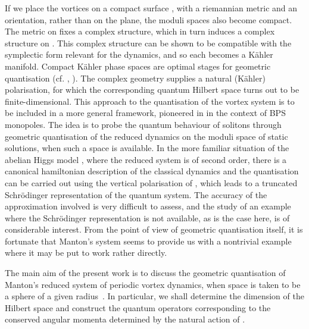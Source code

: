 \documentclass[a4paper,11pt]{article}
\begin{document}
If we place the vortices on a compact surface \myHighlight{$\Sigma$}\coordHE{}, with a
riemannian metric and an orientation, rather than on the
plane, the moduli spaces \coordHE{} also become compact. 
The metric on \myHighlight{$\Sigma$}\coordHE{} fixes a complex structure, which in turn
induces a complex structure on \coordHE{}.
This complex structure can be shown to be compatible with 
the symplectic form relevant for the dynamics, and so each \coordHE{}
becomes a K\"ahler manifold.
Compact K\"ahler phase spaces are optimal stages for geometric 
quantisation (cf. \cite{Sni}, \cite{Woo}). 
The complex geometry supplies a natural (K\"ahler) polarisation, for
which the corresponding quantum Hilbert space turns out to be 
finite-dimensional.
This approach to the quantisation of the vortex system is to be
included in a more general framework, pioneered 
in \cite{GM} in the context of BPS monopoles. 
The idea is to probe the quantum behaviour of solitons through
geometric quantisation of the reduced dynamics on the moduli space of
static solutions, when such a space is available.
In the more familiar situation of the abelian Higgs model \cite{Sam},
where the reduced system is of
second order, there is a canonical hamiltonian description of the
classical dynamics and the quantisation can be carried out using the
vertical polarisation of \coordHE{}, which leads to a truncated
Schr\"odinger representation of the quantum system. The accuracy of
the approximation involved is very difficult to assess, and the study
of an example where the Schr\"odinger representation is not available,
as is the case here, is of
considerable interest. From the point of view of geometric
quantisation itself, it is fortunate that Manton's system
seems to provide us with a nontrivial example where it may be put to 
work rather directly.


The main aim of the present work is to discuss the
geometric quantisation of Manton's reduced system of periodic vortex 
dynamics, when space is taken to be a sphere of a given radius~\coordHE{}. In
particular, we shall determine the dimension of the Hilbert space
and construct the quantum operators corresponding to the 
conserved angular momenta determined by the natural action of \coordHE{}.
\end{document}
